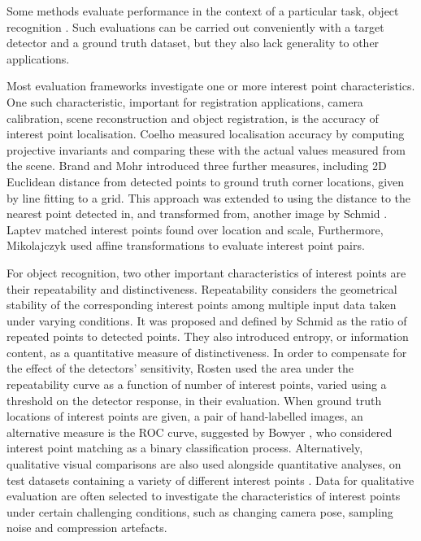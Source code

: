 Some methods evaluate performance in the context of a particular task, \eg object recognition \cite{Shin1999, Dutagaci2011}. Such evaluations can be carried out conveniently with a target detector and a ground truth dataset, but they also lack generality to other applications. 

Most evaluation frameworks investigate one or more interest point characteristics. 
One such characteristic, important for registration applications, \eg camera calibration, scene reconstruction and object registration, is the accuracy of interest point localisation. 
Coelho \etal \cite{Coelho1992} measured localisation accuracy by computing projective invariants and comparing these with the actual values measured from the scene. 
Brand and Mohr \cite{Brand1994} introduced three further measures, including 2D Euclidean distance from detected points to ground truth corner locations, given by line fitting to a grid. This approach was extended to using the distance to the nearest point detected in, and transformed from, another image by Schmid \etal \cite{Schmid2000}. 
Laptev \cite{Laptev2003} matched interest points found over location and scale, 
Furthermore, Mikolajczyk \etal \cite{Mikolajczyk2004} used affine transformations to evaluate interest point pairs. 

For object recognition, two other important characteristics of interest points are their repeatability and distinctiveness. 
Repeatability considers the geometrical stability of the corresponding interest points among multiple input data taken under varying conditions. 
It was proposed and defined by Schmid \etal \cite{Schmid2000} as the ratio of repeated points to detected points. They also introduced entropy, or information content, as a quantitative measure of distinctiveness.
In order to compensate for the effect of the detectors' sensitivity, Rosten \etal \cite{Rosten2010} used the area under the repeatability curve as a function of number of interest points, varied using a threshold on the detector response, in their evaluation. 
When ground truth locations of interest points are given, \eg a pair of hand-labelled images, an alternative measure is the ROC curve, suggested by Bowyer \etal \cite{Bowyer1999}, who considered interest point matching as a binary classification process. Alternatively, qualitative visual comparisons are also used alongside quantitative analyses, on test datasets containing a variety of different interest points \cite{Lindeberg1998, Laptev2005}. Data for qualitative evaluation are often selected to investigate the characteristics of interest points under certain challenging conditions, such as changing camera pose, sampling noise and compression artefacts. 

